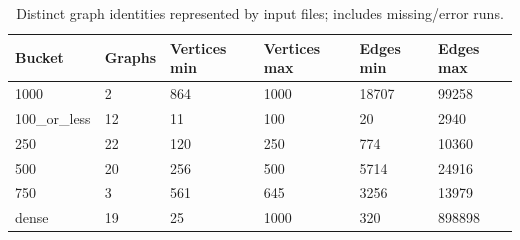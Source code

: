\begin{table}[htbp]
\centering
\caption{Distinct graph identities represented by input files; includes missing/error runs.}
\label{tab:dataset-overview}
\begin{tabular}{llllll}
\hline
Bucket & Graphs & Vertices min & Vertices max & Edges min & Edges max \\
\hline
1000 & 2 & 864 & 1000 & 18707 & 99258 \\
100\_or\_less & 12 & 11 & 100 & 20 & 2940 \\
250 & 22 & 120 & 250 & 774 & 10360 \\
500 & 20 & 256 & 500 & 5714 & 24916 \\
750 & 3 & 561 & 645 & 3256 & 13979 \\
dense & 19 & 25 & 1000 & 320 & 898898 \\
\hline
\end{tabular}
\end{table}
